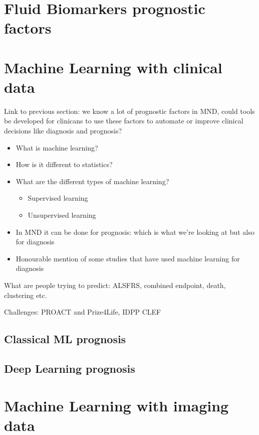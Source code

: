 \section{Fluid Biomarkers prognostic factors}


\section{Machine Learning with clinical data}

Link to previous section: we know a lot of prognostic factors in MND, could tools be developed for clinicans to use these factors to automate or improve clinical decisions like diagnosis and prognosis?


\begin{itemize}
    \item What is machine learning?
    \item How is it different to statistics?
    \item What are the different types of machine learning?
    \begin{itemize}
        \item Supervised learning
        \item Unsupervised learning
    \end{itemize}
    \item In MND it can be done for prognosis: which is what we're looking at but also for diagnosis
    \item Honourable mention of some studies that have used machine learning for diagnosis
\end{itemize}

What are people trying to predict: ALSFRS, combined endpoint, death, clustering etc.

Challenges: PROACT and Prize4Life, IDPP CLEF

\subsection{Classical ML prognosis}

\subsection{Deep Learning prognosis}

\section{Machine Learning with imaging data}


